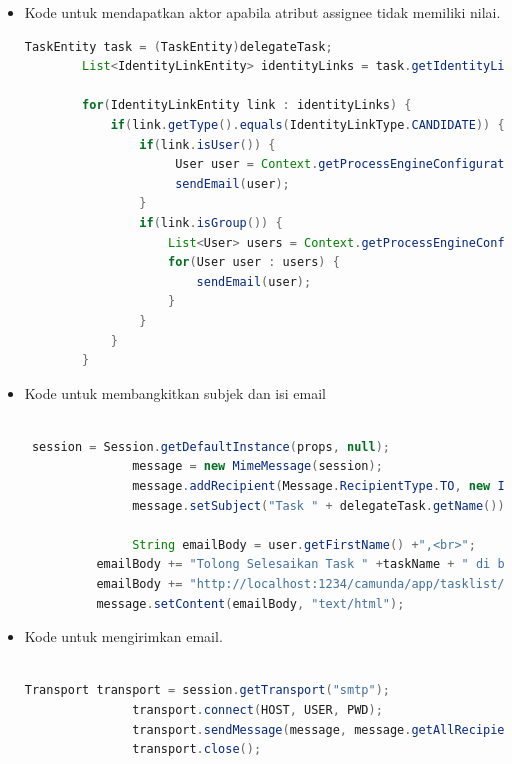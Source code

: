 \begin{itemize}
		\item Kode untuk mendapatkan aktor apabila atribut assignee tidak memiliki nilai.
	\begin{lstlisting}[language=Java,basicstyle=\tiny,caption =TaskAssignmentListener.java]
	    	TaskEntity task = (TaskEntity)delegateTask;
    	List<IdentityLinkEntity> identityLinks = task.getIdentityLinks();
    	
    	for(IdentityLinkEntity link : identityLinks) {
    		if(link.getType().equals(IdentityLinkType.CANDIDATE)) {
    		    if(link.isUser()) {
	    		     User user = Context.getProcessEngineConfiguration().getIdentityService().createUserQuery().userId(link.getUserId()).singleResult();
	    		     sendEmail(user);
    		    }
    		    if(link.isGroup()) {
    		        List<User> users = Context.getProcessEngineConfiguration().getIdentityService().createUserQuery().memberOfGroup(link.getGroupId()).list();
    		        for(User user : users) {
    		        	sendEmail(user);
    		        }
    		    }
    		}
    	}
	\end{lstlisting}
	
	

	\item Kode untuk membangkitkan subjek dan isi email
	\begin{lstlisting}[language=Java,basicstyle=\tiny,caption=TaskAssignmentListener.java]

 session = Session.getDefaultInstance(props, null);
               message = new MimeMessage(session);
               message.addRecipient(Message.RecipientType.TO, new InternetAddress(recipient));
               message.setSubject("Task " + delegateTask.getName());
               
               String emailBody = user.getFirstName() +",<br>";
          emailBody += "Tolong Selesaikan Task " +taskName + " di bawah ini.<br>";
          emailBody += "http://localhost:1234/camunda/app/tasklist/default/#/?task="+taskId;
          message.setContent(emailBody, "text/html");
\end{lstlisting}

	\item Kode untuk mengirimkan email.
	\begin{lstlisting}[language=Java,basicstyle=\tiny,caption=TaskAssignmentListener.java]

Transport transport = session.getTransport("smtp");            
               transport.connect(HOST, USER, PWD);
               transport.sendMessage(message, message.getAllRecipients());
               transport.close();
\end{lstlisting}
	
\end{itemize}

